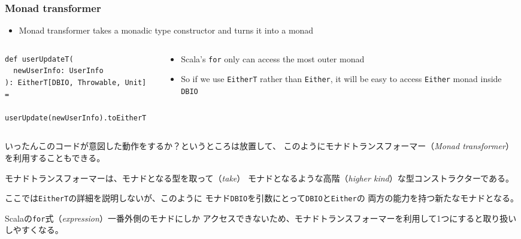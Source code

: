 \begin{frame}[fragile]
  \frametitle{Monad transformer}


  \pause
  \begin{itemize}
    \item Monad transformer takes a monadic type constructor
    and turns it into a monad
  \end{itemize}

  \begin{columns}
    \begin{column}{0.45\textwidth}
\begin{lstlisting}[style=scala]
def userUpdateT(
  newUserInfo: UserInfo
): EitherT[DBIO, Throwable, Unit] =
  userUpdate(newUserInfo).toEitherT
\end{lstlisting}
    \end{column}
    \begin{column}{0.55\textwidth}
      \begin{itemize}
        \item Scala's \lstinline|for| only can access
        the most outer monad

        \item So if we use \lstinline|EitherT| rather than \lstinline|Either|,
        it will be easy to access \lstinline|Either| monad
        inside \lstinline|DBIO|
      \end{itemize}
    \end{column}
  \end{columns}

  \begin{notes}
    \item いったんこのコードが意図した動作をするか？というところは放置して、
    このようにモナドトランスフォーマー（\emph{Monad transformer}）を利用することもできる。

    \item モナドトランスフォーマーは、モナドとなる型を取って（\emph{take}）
    モナドとなるような高階（\emph{higher kind}）な型コンストラクターである。

    \item ここでは\lstinline|EitherT|の詳細を説明しないが、このように
    モナド\lstinline|DBIO|を引数にとって\lstinline|DBIO|と\lstinline|Either|の
    両方の能力を持つ新たなモナドとなる。

    \item Scalaの\lstinline|for|式（\emph{expression}）一番外側のモナドにしか
    アクセスできないため、モナドトランスフォーマーを利用して1つにすると取り扱いしやすくなる。
  \end{notes}
\end{frame}

